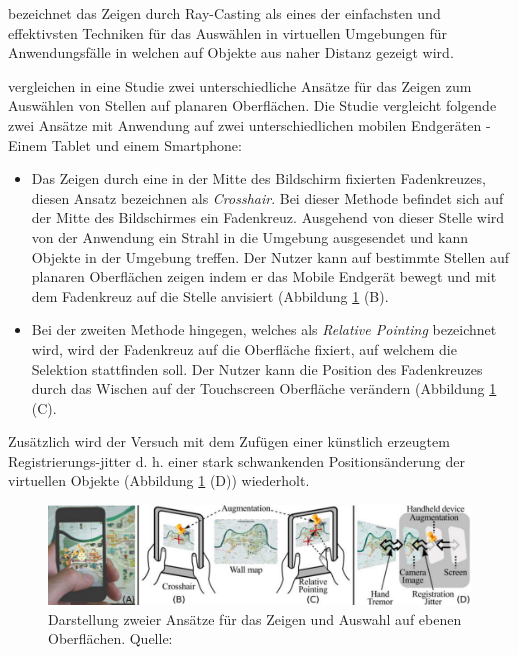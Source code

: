 \citeauthor{Bowman2011} bezeichnet das Zeigen durch Ray-Casting als eines der einfachsten und effektivsten Techniken für das Auswählen in virtuellen Umgebungen für Anwendungsfälle in welchen auf Objekte aus 
naher Distanz gezeigt wird.\cite[S.~153]{Bowman2011}

\citeauthor{Vincent2013} vergleichen in eine Studie zwei unterschiedliche Ansätze für das Zeigen zum Auswählen von Stellen auf planaren Oberflächen. 
Die Studie vergleicht folgende zwei Ansätze mit Anwendung auf zwei unterschiedlichen mobilen Endgeräten - Einem Tablet und einem Smartphone: 

\begin{itemize}
\item{Das Zeigen durch eine in der Mitte des Bildschirm fixierten Fadenkreuzes, diesen Ansatz bezeichnen \citeauthor{Vincent2013} als \textit{Crosshair}. Bei dieser Methode 
befindet sich auf der Mitte des Bildschirmes ein Fadenkreuz. Ausgehend von dieser Stelle wird von der Anwendung ein Strahl in die Umgebung ausgesendet und 
kann Objekte in der Umgebung treffen. Der Nutzer kann auf bestimmte Stellen auf planaren Oberflächen zeigen indem er das Mobile Endgerät bewegt und mit dem Fadenkreuz
auf die Stelle anvisiert (Abbildung \ref{img:pointing_vergleich} (B).} 
\item{Bei der zweiten Methode hingegen, welches als \textit{Relative Pointing} bezeichnet wird, wird der Fadenkreuz auf die Oberfläche fixiert, auf welchem die Selektion stattfinden soll. Der Nutzer kann die Position des Fadenkreuzes durch das Wischen auf der 
	Touchscreen Oberfläche verändern (Abbildung \ref{img:pointing_vergleich} (C).}
\end{itemize}

Zusätzlich wird der Versuch mit dem Zufügen einer künstlich erzeugtem Registrierungs-jitter d. h. einer stark schwankenden Positionsänderung der virtuellen Objekte (Abbildung \ref{img:pointing_vergleich} (D)) wiederholt. 

\begin{figure}[H]
	\centering
	\includegraphics[width=.7\textwidth]{resources/analyse/Pointing_techniken.png}
	\caption{Darstellung zweier Ansätze für das Zeigen und Auswahl auf ebenen Oberflächen. Quelle: \cite{Vincent2013}}
	\label{img:pointing_vergleich}
\end{figure}

